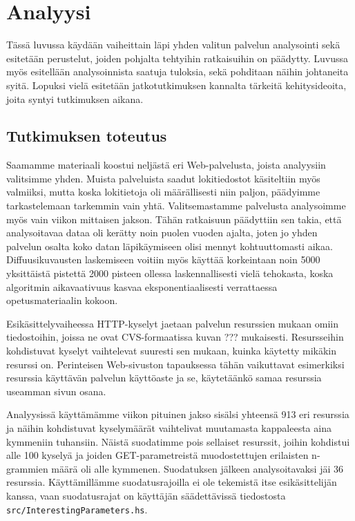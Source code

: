 
\chapter{Analyysi}

Tässä luvussa käydään vaiheittain läpi yhden valitun palvelun analysointi sekä esitetään perustelut, joiden pohjalta tehtyihin ratkaisuihin on päädytty. 
Luvussa myös esitellään analysoinnista saatuja tuloksia, sekä pohditaan näihin johtaneita syitä. Lopuksi vielä esitetään jatkotutkimuksen kannalta 
tärkeitä kehitysideoita, joita syntyi tutkimuksen aikana. 
 
\section{Tutkimuksen toteutus}

Saamamme materiaali koostui neljästä eri Web-palvelusta, joista analyysiin valitsimme yhden. Muista palveluista saadut lokitiedostot käsiteltiin
myös valmiiksi, mutta koska lokitietoja oli määrällisesti niin paljon, päädyimme tarkastelemaan tarkemmin vain yhtä. Valitsemastamme palvelusta
analysoimme myös vain viikon mittaisen jakson. Tähän ratkaisuun päädyttiin sen takia, että analysoitavaa dataa oli kerätty noin puolen vuoden ajalta,
joten jo yhden palvelun osalta koko datan läpikäymiseen olisi mennyt kohtuuttomasti aikaa. Diffuusikuvausten laskemiseen voitiin
myös käyttää korkeintaan noin 5000 yksittäistä pistettä 2000 pisteen ollessa laskennallisesti vielä tehokasta, koska algoritmin aikavaativuus kasvaa
eksponentiaalisesti verrattaessa opetusmateriaalin kokoon. 
 
Esikäsittelyvaiheessa HTTP-kyselyt jaetaan palvelun resurssien mukaan omiin tiedostoihin, joissa ne ovat CVS-formaatissa kuvan ??? mukaisesti. 
Resursseihin kohdistuvat kyselyt vaihtelevat suuresti sen mukaan, kuinka käytetty mikäkin resurssi on. Perinteisen Web-sivuston tapauksessa tähän
vaikuttavat esimerkiksi resurssia käyttävän palvelun käyttöaste ja se, käytetäänkö samaa resurssia useamman sivun osana. 

Analyysissä käyttämämme viikon pituinen jakso sisälsi yhteensä 913 eri resurssia ja näihin kohdistuvat kyselymäärät vaihtelivat muutamasta kappaleesta
aina kymmeniin tuhansiin. Näistä suodatimme pois sellaiset resurssit, joihin kohdistui alle 100 kyselyä ja joiden GET-parametreistä muodostettujen
erilaisten n-grammien määrä oli alle kymmenen. Suodatuksen jälkeen analysoitavaksi jäi 36 resurssia. Käyttämillämme suodatusrajoilla ei ole tekemistä 
itse esikäsittelijän kanssa, vaan suodatusrajat on käyttäjän säädettävissä tiedostosta \texttt{src/InterestingParameters.hs}.
    
